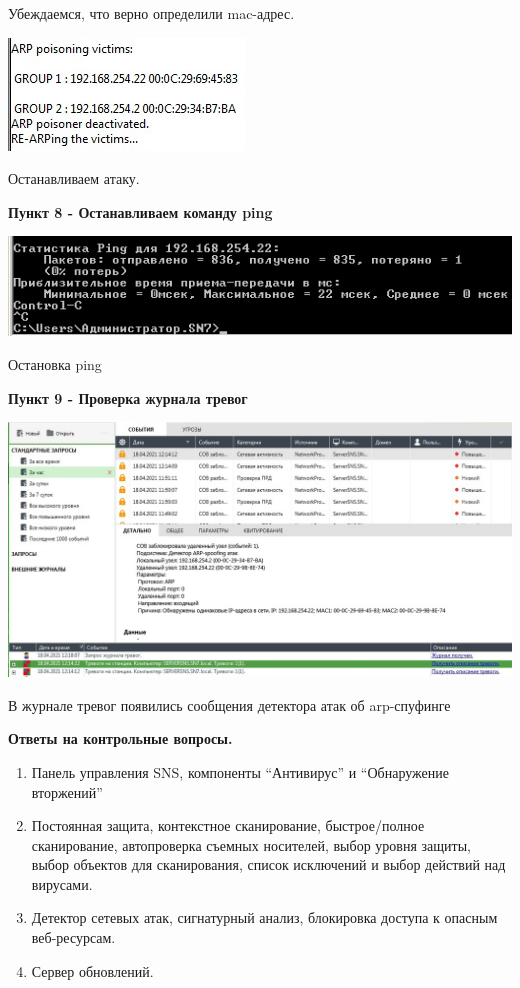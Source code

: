 \documentclass[a4paper,14pt]{extarticle}
\begin{document}
\begin{center}
        Убеждаемся, что верно определили mac-адрес.

        \includegraphics[scale=0.9]{pics/7_5.jpg}

        Останавливаем атаку.
    \end{center}

    \textbf{Пункт 8 - Останавливаем команду ping}
    \begin{center}
        \includegraphics[scale=0.5]{pics/8.jpg}

        Остановка ping
    \end{center}

    \vspace{-2ex}
    \textbf{Пункт 9 - Проверка журнала тревог}
    \begin{center}
        \includegraphics[scale=0.4]{pics/9.jpg}

        В журнале тревог появились сообщения детектора атак об arp-спуфинге
    \end{center}

    \textbf{Ответы на контрольные вопросы.}

    \begin{enumerate}
        \singlespacing
        \item Панель управления SNS, компоненты “Антивирус” и “Обнаружение вторжений”
        \item Постоянная защита, контекстное сканирование, быстрое/полное сканирование, автопроверка съемных носителей, выбор уровня защиты, выбор объектов для сканирования, список исключений и выбор действий над вирусами.
        \item Детектор сетевых атак, сигнатурный анализ, блокировка доступа к опасным веб-ресурсам.
        \item Сервер обновлений.
    \end{enumerate}
\end{document}
